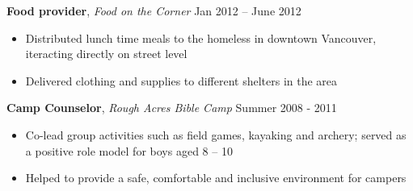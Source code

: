 \documentclass[11pt]{article}
\begin{document}
\medskip
{}
%
\vspace{1mm}
\begin{addmargin}[2.75em]{0em}
\textbf{Food provider}, \textit{Food on the Corner} \hfill Jan 2012 -- June 2012
\end{addmargin}
%
\vspace{1mm}
\begin{addmargin}[1.75em]{0em}
\begin{itemize}
\setlength\itemsep{-0.4em}
\item Distributed lunch time meals to the homeless in downtown Vancouver, iteracting directly on street level
\item Delivered clothing and supplies to different shelters in the area
\end{itemize}
\end{addmargin}
%
\vspace{2mm}
\begin{addmargin}[2.75em]{0em}
\textbf{Camp Counselor}, \textit{Rough Acres Bible Camp} \hfill Summer 2008 - 2011
\end{addmargin}
%
\vspace{1mm}
\begin{addmargin}[1.75em]{0em}
\begin{itemize}
\setlength\itemsep{-0.4em}
\item Co-lead group activities such as field games, kayaking and archery; served as a positive role model for boys aged 8 -- 10
\item Helped to provide a safe, comfortable and inclusive environment for campers
\end{itemize}
\end{addmargin}

\end{document}
